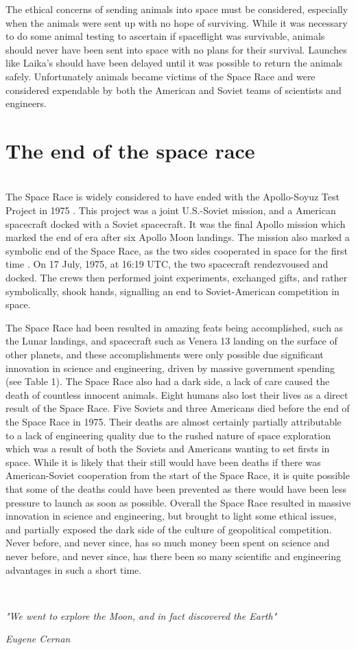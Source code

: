\documentclass[10pt, journal]{IEEEtran}
\begin{document}
The ethical concerns of sending animals into space must be considered, especially when the animals were sent up with no hope of surviving. While it was necessary to do some animal testing to ascertain if spaceflight was survivable, animals should never have been sent into space with no plans for their survival. Launches like Laika's should have been delayed until it was possible to return the animals safely. Unfortunately animals became victims of the Space Race and were considered expendable by both the American and Soviet teams of scientists and engineers.

\section{The end of the space race}
~\\
The Space Race is widely considered to have ended with the Apollo-Soyuz Test Project in 1975 \cite{taylor}. This project was a joint U.S.-Soviet mission, and a American spacecraft docked with a Soviet spacecraft. It was the final Apollo mission which marked the end of era after six Apollo Moon landings. The mission also marked a symbolic end of the Space Race, as the two sides cooperated in space for the first time \cite{handshake}. On 17 July, 1975, at 16:19 UTC, the two spacecraft rendezvoused and docked. The crews then performed joint experiments, exchanged gifts, and rather symbolically, shook hands, signalling an end to Soviet-American competition in space.

 The Space Race  had been resulted in amazing feats being accomplished, such as the Lunar landings, and spacecraft such as Venera 13 landing on the surface of other planets, and these accomplishments were only possible due significant innovation in science and engineering, driven by massive government spending (see Table 1). The Space Race also had a dark side, a lack of care caused the death of countless innocent animals. Eight humans also lost their lives as a direct result of the Space Race. Five Soviets and three Americans died before the end of the Space Race in 1975. Their deaths are almost certainly partially attributable to a lack of engineering quality due to the rushed nature of space exploration which was a result of both the Soviets and Americans wanting to set firsts in space. While it is likely that their still would have been deaths if there was American-Soviet cooperation from the start of the Space Race, it is quite possible that some of the deaths could have been prevented as there would have been less pressure to launch as soon as possible. Overall the Space Race resulted in massive innovation in science and engineering, but brought to light some ethical issues, and partially exposed the dark side of the culture of geopolitical competition. Never before, and never since, has so much money been spent on science and never before, and never since, has there been so many scientific and engineering advantages in such a short time.

~\\

\epigraph{\textit{"We went to explore the Moon, and in fact discovered the Earth"}}{\textit{Eugene Cernan}}


%

\end{document}
